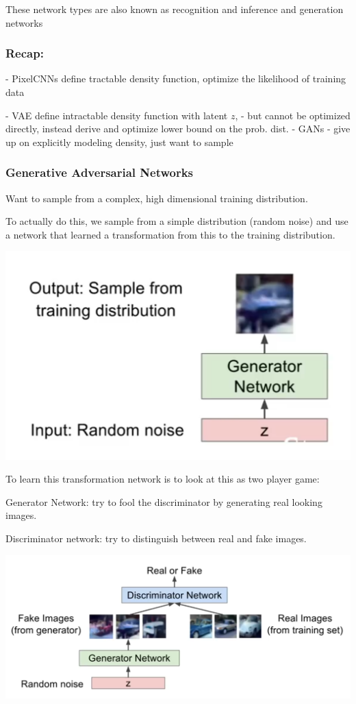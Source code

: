 These network types are also known as recognition and inference and generation networks

\subsubsection{Recap:}

- PixelCNNs define tractable density function, optimize the likelihood of training data

- VAE define intractable density function with latent $z$, - but cannot be optimized directly, instead derive and optimize lower bound on the prob. dist.
- GANs - give up on explicitly modeling density, just want to sample

\subsubsection{Generative Adversarial Networks}

Want to sample from a complex, high dimensional training distribution.

To actually do this, we sample from a simple distribution (random noise) and use a network that learned a transformation from this to the training distribution.

\includegraphics[width=0.5\columnwidth]{fei_fei_li/lecture_13/gans_1.png}



To learn this transformation network is to look at this as two player game:

Generator Network: try to fool the discriminator by generating real looking images.

Discriminator network: try to distinguish between real and fake images.

\includegraphics[width=0.5\columnwidth]{fei_fei_li/lecture_13/gan_pipeline.png}

